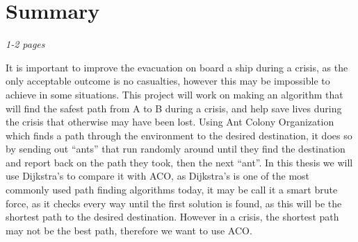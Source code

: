 \chapter{Summary}
\label{ch:summary}
\textit{1-2 pages}


It is important to improve the evacuation on board a ship during a crisis, as the only acceptable outcome is no casualties, however this may be impossible to achieve in some situations. This project will work on making an algorithm that will find the safest path from A to B during a crisis, and help save lives during the crisis that otherwise may have been lost. Using Ant Colony Organization which finds a path through the environment to the desired destination, it does so by sending out “ants” that run randomly around until they find the destination and report back on the path they took, then the next “ant”.  In this thesis we will use Dijkstra's to compare it with ACO, as Dijkstra's is one of the most commonly used path finding algorithms today, it may be call it a smart brute force, as it checks every way until the first solution is found, as this will be the shortest path to the desired destination. However in a crisis, the shortest path may not be the best path, therefore we want to use ACO.